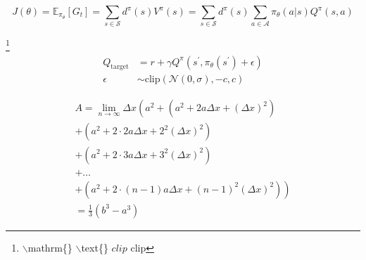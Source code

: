 \documentclass{article}
\begin{document}
\begin{frame}{ }
    \begin{exampleblock}{ } %
        \begin{equation*}
            J(\theta) = \mathbb{E}_{\pi_\theta}[G_t] = \sum_{s\in\mathcal{S}} d^\pi (s)V^\pi(s)=\sum_{s\in\mathcal{S}} d^\pi(s)\sum_{a\in\mathcal{A}}\pi_\theta(a|s)Q^\pi(s,a)
        \end{equation*}
    \end{exampleblock}
    \begin{exampleblock}{ \footnote{  $\backslash$mathrm\{\}   $\backslash$text\{\}   $clip$  $\mathrm{clip}$  }}
        \begin{align}
            Q_\mathrm{target}&=r+\gamma Q^\pi(s^\prime, \pi_\theta(s^\prime)+\epsilon)\\
            \epsilon&\sim\mathrm{clip}(\mathcal{N}(0, \sigma), -c, c)\nonumber
        \end{align}
    \end{exampleblock}
\end{frame}

\begin{frame}
    \begin{exampleblock}{ }
        \begin{multline}
            A=\lim_{n\rightarrow\infty}\Delta x\left(a^{2}+\left(a^{2}+2a\Delta x+\left(\Delta x\right)^{2}\right)\right.\label{eq:reset}\\
            +\left(a^{2}+2\cdot2a\Delta x+2^{2}\left(\Delta x\right)^{2}\right)\\
            +\left(a^{2}+2\cdot3a\Delta x+3^{2}\left(\Delta x\right)^{2}\right)\\
            +\ldots\\
            \left.+\left(a^{2}+2\cdot(n-1)a\Delta x+(n-1)^{2}\left(\Delta x\right)^{2}\right)\right)\\
            =\frac{1}{3}\left(b^{3}-a^{3}\right)
        \end{multline}
    \end{exampleblock}
\end{frame}
\end{document}
